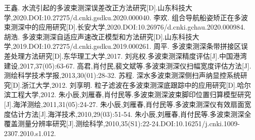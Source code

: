 \documentclass[12pt,a4paper]{article}
\begin{document}
\clearpage
\begin{thebibliography}{99}
		王鑫. 水流引起的多波束测深误差改正方法研究[D].山东科技大学,2020.DOI:10.27275/d.cnki.gsdku.2020.000040.
	李欢. 组合导航船姿矫正在多波束测深中的应用研究[D].长安大学,2020.DOI:10.26976/d.cnki.gchau.2020.000984.
		胡浩. 多波束测深自适应声速改正模型和方法研究[D].山东科技大学,2019.DOI:10.27275/d.cnki.gsdku.2019.000261.
		周平. 多波束测深条带拼接区误差处理方法研究[D].东华理工大学,2017.
		刘兆权.多波束测深精度评估[J].中国港湾建设,2017,37(05):63-67.
		高君,肖付民,裴文斌等.多波束测深仪扫幅宽度评估方法[J].测绘科学技术学报,2013,30(01):28-32.
		苏程. 深水多波束测深侧扫声纳显控系统研究[D].浙江大学,2012.
		刘享明. 粒子滤波在多波束测深底跟踪中的应用研究[D].哈尔滨工程大学,2012.
		朱小辰,刘雁春,肖付民等.多波束测深波束脚印位置归算模型研究[J].海洋测绘,2011,31(05):24-27.
		朱小辰,刘雁春,肖付民等.多波束测深仪有效扇面宽度估计方法[J].海洋技术,2010,29(03):51-54.
	朱小辰,刘雁春,肖付民等.多波束测深全覆盖测量分辨率研究[J].测绘科学,2010,35(S1):22-24.DOI:10.16251/j.cnki.1009-2307.2010.s1.012.
\end{thebibliography}
\clearpage
\appendix
\end{document}
